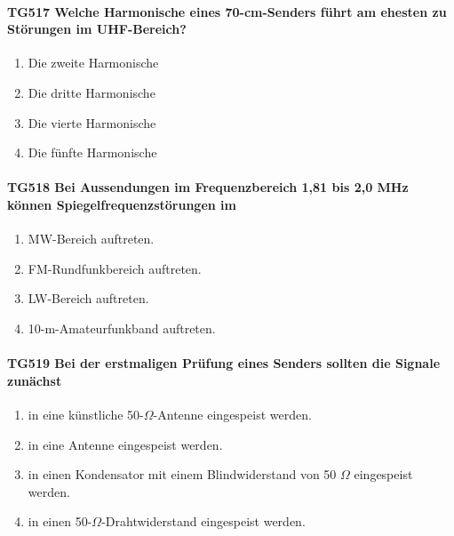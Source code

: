 \documentclass[8pt]{article}
\begin{document}
\paragraph*{TG517 Welche Harmonische eines 70-cm-Senders führt am ehesten zu Störungen im UHF-Bereich?}
\begin{enumerate}[nolistsep,label=\Alph*]
\item Die zweite Harmonische 
\item Die dritte Harmonische
\item Die vierte Harmonische
\item Die fünfte Harmonische
\end{enumerate}

\paragraph*{TG518 Bei Aussendungen im Frequenzbereich 1,81 bis 2,0 MHz können Spiegelfrequenzstörungen im}
\begin{enumerate}[nolistsep,label=\Alph*]
\item MW-Bereich auftreten.
\item FM-Rundfunkbereich auftreten.
\item LW-Bereich auftreten.
\item 10-m-Amateurfunkband auftreten.
\end{enumerate}

\paragraph*{TG519 Bei der erstmaligen Prüfung eines Senders sollten die Signale zunächst} 
\begin{enumerate}[nolistsep,label=\Alph*]
\item in eine künstliche 50-$\Omega$-Antenne eingespeist werden.
\item in eine Antenne eingespeist werden.
\item in einen Kondensator mit einem Blindwiderstand von 50 $\Omega$ eingespeist werden.
\item in einen 50-$\Omega$-Drahtwiderstand eingespeist werden.
\end{enumerate}
\end{document}
